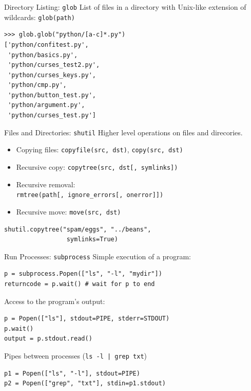 \begin{frame}[fragile]{Directory Listing: \texttt{glob}}
List of files in a directory with Unix-like extension of wildcards: \texttt{glob(path)}
\begin{lstlisting}[style=Shell]
>>> glob.glob("python/[a-c]*.py")
['python/confitest.py',
 'python/basics.py',
 'python/curses_test2.py',
 'python/curses_keys.py',
 'python/cmp.py',
 'python/button_test.py',
 'python/argument.py',
 'python/curses_test.py']
\end{lstlisting}
\end{frame}

\begin{frame}[fragile]{Files and Directories: \texttt{shutil}}
Higher level operations on files and direcories.
\begin{itemize}
\item Copying files: \texttt{copyfile(src, dst)}, \texttt{copy(src, dst)}
\item Recursive copy: \texttt{copytree(src, dst[, symlinks])}
\item Recursive removal: \\\texttt{rmtree(path[, ignore\_errors[, onerror]])}
\item Recursive move: \texttt{move(src, dst)}
\end{itemize}
\begin{lstlisting}[style=Python]
shutil.copytree("spam/eggs", "../beans", 
                 symlinks=True)
\end{lstlisting}
\end{frame}

\begin{frame}[fragile]{Run Processes: \texttt{subprocess}}
Simple execution of a program:
\begin{lstlisting}[style=Python]
p = subprocess.Popen(["ls", "-l", "mydir"])
returncode = p.wait() # wait for p to end
\end{lstlisting}
Access to the program's output:
\begin{lstlisting}[style=Python]
p = Popen(["ls"], stdout=PIPE, stderr=STDOUT) 
p.wait()
output = p.stdout.read()
\end{lstlisting}
Pipes between processes (\lstinline{ls -l | grep txt})
\begin{lstlisting}[style=Python]
p1 = Popen(["ls", "-l"], stdout=PIPE)
p2 = Popen(["grep", "txt"], stdin=p1.stdout)
\end{lstlisting}
\end{frame}

